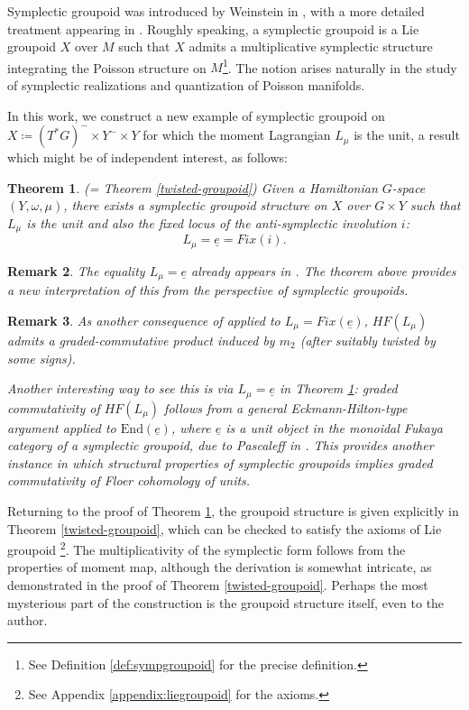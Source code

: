 \documentclass{amsart}
\newtheorem{theorem}{Theorem}[section]
\newtheorem{remark}[theorem]{Remark}
\numberwithin{equation}{section}
\newcommand{\End}{\mathrm{End}}
\begin{document}
Symplectic groupoid was introduced by Weinstein in \cite{weinsteinsympgroupoid}, with a more detailed treatment appearing in \cite{sympgroupoid}. Roughly speaking, a symplectic groupoid is a Lie groupoid $X$ over $M$ such that $X$ admits a multiplicative symplectic structure integrating the Poisson structure on $M$\footnote{See Definition \ref{def:sympgroupoid} for the precise definition.}.  The notion arises naturally in the study of symplectic realizations and quantization of Poisson manifolds. 

In this work, we construct a new example of symplectic groupoid on $X \coloneqq (T^*G)^- \times Y^- \times Y$ for which the moment Lagrangian $L_\mu$ is the unit, a result which might be of independent interest, as follows:

\begin{theorem}(= Theorem \ref{twisted-groupoid}) \label{intro:twisted-groupoid}
    Given a Hamiltonian $G$-space $(Y, \omega, \mu)$, there exists a symplectic groupoid structure on $X$ over $G \times Y$
 such that $L_\mu$ is the unit and also the fixed locus of the anti-symplectic involution $i$:
    $$L_\mu = \underline{e} = Fix(i).$$
\end{theorem}

\begin{remark}
    The equality $L_\mu = \underline{e}$ already appears in \cite{Weinsteinsympgeom}. The theorem above provides a new interpretation of this from the perspective of symplectic groupoids.
\end{remark}

\begin{remark}
As another consequence of \cite[Corollary 1.6]{FOOOinvol} applied to $L_\mu = Fix(\underline{e})$, $HF(L_\mu)$ admits a graded-commutative product induced by $m_2$ (after suitably twisted by some signs). 

Another interesting way to see this is via $L_\mu  = \underline{e}$ in Theorem \ref{intro:twisted-groupoid}: graded commutativity of $HF(L_\mu)$ follows from a 
general Eckmann-Hilton-type argument applied to $\End(\underline{e})$, where $\underline{e}$ is a unit object in the monoidal Fukaya category of a symplectic groupoid, due to Pascaleff in \cite[Section 5.1]{Pascaleffmonoidal}. This provides another instance in which structural properties of symplectic groupoids implies graded commutativity of Floer cohomology of units.
\end{remark}

Returning to the proof of Theorem \ref{intro:twisted-groupoid}, the groupoid structure is given explicitly in 
Theorem \ref{twisted-groupoid}, which can be checked to satisfy the axioms of Lie groupoid \footnote{See Appendix \ref{appendix:liegroupoid} for the axioms.}. The multiplicativity of the symplectic form follows from the properties of moment map, 
although the derivation is somewhat intricate, as demonstrated in the proof of Theorem \ref{twisted-groupoid}. Perhaps the most mysterious part of the construction is the groupoid structure itself, even to the author.
\end{document}
